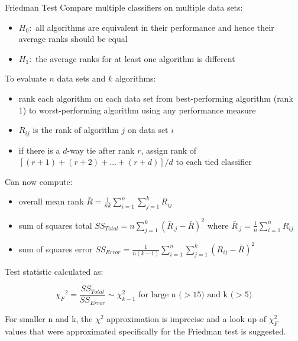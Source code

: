     \begin{frame}[c,allowframebreaks]{Friedman Test}
    Compare multiple classifiers on multiple data sets:
    \begin{itemize}
    \item $H_0:$ all algorithms are equivalent in their performance and hence their average ranks should be equal
    \item $H_1:$ the average ranks for at least one algorithm is different
    \end{itemize}

    To evaluate $n$ data sets and $k$ algorithms:

    \begin{itemize}
      \item rank each algorithm on each data set from best-performing algorithm (rank 1) to worst-performing algorithm using any performance measure
      \item $R_{ij}$ is the rank of algorithm $j$ on data set $i$
      \item if there is a $d$-way tie after rank $r$, assign rank of $
          \left[(r+1) + (r+2) + ... + (r+d)\right] /d $ to each tied classifier
    \end{itemize}

    \framebreak

    Can now compute:
    \begin{itemize}
      \item overall mean rank
      $ \bar{R} = \frac{1}{nk} \sum_{i=1}^{n} \sum_{j=1}^{k} R_{ij} $
      \item sum of squares total
      $ SS_{Total} = n \sum_{j=1}^{k} (\bar{R}_{.j} - \bar{R})^2 $ where $\bar{R}_{.j} =  \frac{1}{n} \sum_{i=1}^{n} R_{ij}$
      \item sum of squares error
      $ SS_{Error} = \frac{1}{n(k-1)} \sum_{i=1}^{n} \sum_{j=1}^{k} (R_{ij} - \bar{R})^2$
    \end{itemize}

    Test statistic calculated as:

    $${\chi_F}^2 = \frac{SS_{Total}}{SS_{Error}} \sim \chi_{k-1}^2 \text{ for
    large n ($>$15) and k ($>$5)}$$

    For smaller n and k, the $\chi^2$ approximation is imprecise and a look up of $\chi_F^2$ values that were approximated specifically for the Friedman test is suggested.
    \end{frame}


